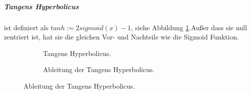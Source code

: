 \documentclass[12pt,a4paper]{scrartcl}
\numberwithin{equation}{section}
\begin{document}
\subparagraph{Tangens Hyperbolicus} ist definiert als	$ tanh := 2sigmoid(x) -1$, siehe Abbildung \ref{fig:tanh}.Außer dass sie null zentriert ist, hat sie die gleichen Vor- und Nachteile wie die Sigmoid Funktion.
\begin{figure}[h]
	\caption{Tangens Hyperbolicus.}
	\begin{subfigure}{.5\textwidth}	
		\centering	
		\caption{Tangens Hyperbolicus.}
	\end{subfigure}%
	\begin{subfigure}{.5\textwidth}		
		\centering
		\caption{Ableitung der Tangens Hyperbolicus.}
	\end{subfigure}
	\label{fig:tanh}		
\end{figure}
\end{document}
